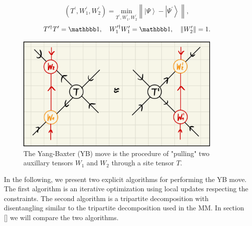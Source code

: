 \begin{equation}
	\label{eq:disoTPS_YB_move_standard}
	\left(T^\prime, W_1^\prime, W_2^\prime\right) = \underset{T^\prime,W_1^\prime,W_2^\prime}{\text{min}}\left\lVert \left|\Psi\right\rangle - \left|\Psi^\prime\right\rangle\right\rVert,
\end{equation}
\begin{equation}
	\label{eq:disoTPS_YB_move_constraints}
	T^{\prime\dagger}T^\prime = \id, \quad W_1^{\prime\dagger}W_1^\prime = \id, \quad \left\lVert W_2^\prime \right\rVert = 1.
\end{equation} \par
\begin{figure}
	\centering
	\includegraphics[width=0.9\textwidth]{figures/Tensor_Networks/YB_move_closeup.jpeg}
	\caption{The Yang-Baxter (YB) move is the procedure of "pulling" two auxillary tensors $W_1$ and $W_2$ through a site tensor $T$.}
	\label{fig:disoTPS_YB_move_closeup}
\end{figure}
In the following, we present two explicit algorithms for performing the YB move. The first algorithm is an iterative optimization using local updates respecting the constraints. The second algorithm is a tripartite decomposition with disentangling similar to the tripartite decomposition used in the MM. In section \ref{} we will compare the two algorithms.

